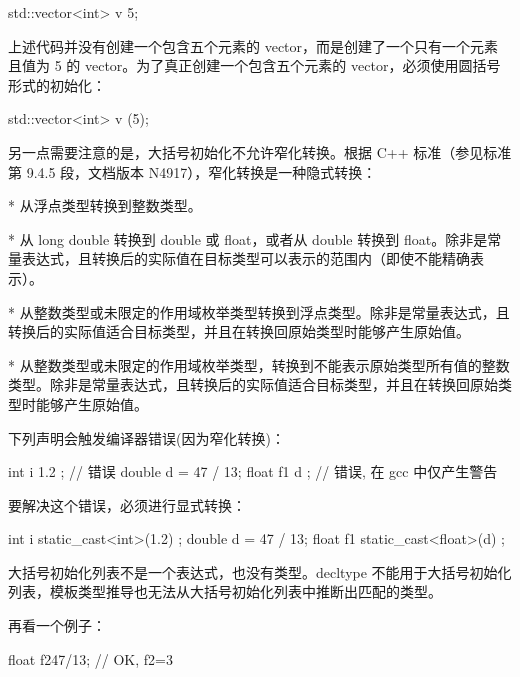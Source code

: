 \begin{cpp}
std::vector<int> v {5};
\end{cpp}

上述代码并没有创建一个包含五个元素的 vector，而是创建了一个只有一个元素且值为 5 的 vector。为了真正创建一个包含五个元素的 vector，必须使用圆括号形式的初始化：

\begin{cpp}
std::vector<int> v (5);
\end{cpp}

另一点需要注意的是，大括号初始化不允许窄化转换。根据 C++ 标准（参见标准第 9.4.5 段，文档版本 N4917），窄化转换是一种隐式转换：

\begin{myTip}
* 从浮点类型转换到整数类型。

* 从 long double 转换到 double 或 float，或者从 double 转换到 float。除非是常量表达式，且转换后的实际值在目标类型可以表示的范围内（即使不能精确表示）。

* 从整数类型或未限定的作用域枚举类型转换到浮点类型。除非是常量表达式，且转换后的实际值适合目标类型，并且在转换回原始类型时能够产生原始值。

* 从整数类型或未限定的作用域枚举类型，转换到不能表示原始类型所有值的整数类型。除非是常量表达式，且转换后的实际值适合目标类型，并且在转换回原始类型时能够产生原始值。
\end{myTip}

下列声明会触发编译器错误(因为窄化转换)：

\begin{cpp}
int i{ 1.2 };           // 错误
double d = 47 / 13;
float f1{ d };          // 错误, 在 gcc 中仅产生警告
\end{cpp}

要解决这个错误，必须进行显式转换：

\begin{cpp}
int i{ static_cast<int>(1.2) };
double d = 47 / 13;
float f1{ static_cast<float>(d) };
\end{cpp}

\begin{myNotic}
大括号初始化列表不是一个表达式，也没有类型。decltype 不能用于大括号初始化列表，模板类型推导也无法从大括号初始化列表中推断出匹配的类型。
\end{myNotic}

再看一个例子：

\begin{cpp}
float f2{47/13};        // OK, f2=3
\end{cpp}

